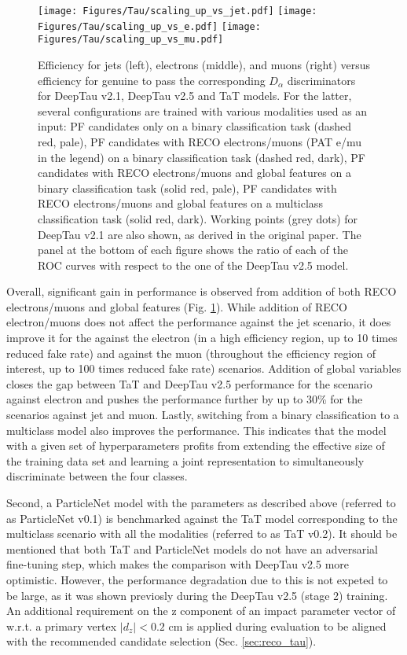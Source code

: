 \begin{figure}[!t]
    \centering
    \texttt{[image: Figures/Tau/scaling\_up\_vs\_jet.pdf]}
    \texttt{[image: Figures/Tau/scaling\_up\_vs\_e.pdf]}
    \texttt{[image: Figures/Tau/scaling\_up\_vs\_mu.pdf]}
    \caption{Efficiency for jets (left), electrons (middle), and muons (right) versus efficiency for genuine \tauh to pass the corresponding $D_\alpha$ discriminators for DeepTau v2.1, DeepTau v2.5 and TaT models. For the latter, several configurations are trained with various modalities used as an input: PF candidates only on a binary classification task (dashed red, pale), PF candidates with RECO electrons/muons (PAT e/mu in the legend) on a binary classification task (dashed red, dark), PF candidates with RECO electrons/muons and global features on a binary classification task (solid red, pale), PF candidates with RECO electrons/muons and global features on a multiclass classification task (solid red, dark). Working points (grey dots) for DeepTau v2.1 are also shown, as derived in the original paper. The panel at the bottom of each figure shows the ratio of each of the ROC curves with respect to the one of the DeepTau v2.5 model.}
    \label{fig:tat_modalities}
\end{figure}

Overall, significant gain in performance is observed from addition of both RECO electrons/muons and global features (Fig. \ref{fig:tat_modalities}). While addition of RECO electron/muons does not affect the performance against the jet scenario, it does improve it for the \tauh against the electron (in a high \tauh efficiency region, up to 10 times reduced fake rate) and against the muon (throughout the \tauh efficiency region of interest, up to 100 times reduced fake rate) scenarios. Addition of global variables closes the gap between TaT and DeepTau v2.5 performance for the scenario against electron and pushes the performance further by up to 30\% for the scenarios against jet and muon. Lastly, switching from a binary classification to a multiclass model also improves the performance. This indicates that the model with a given set of hyperparameters profits from extending the effective size of the training data set and learning a joint representation to simultaneously discriminate between the four classes.

Second, a ParticleNet model with the parameters as described above (referred to as ParticleNet v0.1) is benchmarked against the TaT model corresponding to the multiclass scenario with all the modalities (referred to as TaT v0.2). It should be mentioned that both TaT and ParticleNet models do not have an adversarial fine-tuning step, which makes the comparison with DeepTau v2.5 more optimistic. However, the performance degradation due to this is not expeted to be large, as it was shown previosly during the DeepTau v2.5 (stage 2) training. An additional requirement on the z component of an impact parameter vector of \tauh w.r.t. a primary vertex $|d_z| < 0.2$ cm is applied during evaluation to be aligned with the recommended \tauh candidate selection (Sec. \ref{sec:reco_tau}). 

